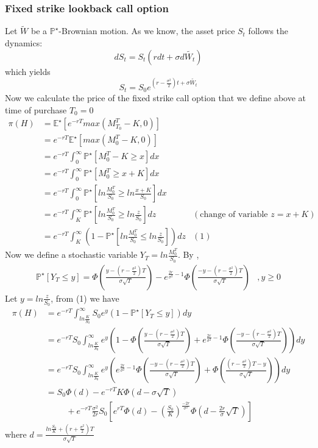 \documentclass{article}
\begin{document}
\subsubsection{Fixed strike lookback call option
}
Let $\widetilde{W}$ be a $\mathbb{P}^{\star}$-Brownian motion. As we know, the asset price $S_t$ follows the dynamics:
\[
dS_t=S_t(rdt + \sigma d \widetilde{W_t})
\]
which yields
\[
S_t=S_0 e^{(r - \frac{\sigma^2}{2})t + \sigma \widetilde{W_t}}
\]
Now we calculate the price of the fixed strike call option that we define above at time of purchase $T_0=0$
\begin{align*}
\pi(H) 	&= \mathbb{E^{\star}}[e^{-rT} max(M_{T_0}^T - K, 0)] \\
			&= e^{-rT} \mathbb{E^{\star}}[max(M_{0}^T - K, 0)] \\
			&= e^{-rT} \int_{0}^{\infty} \mathbb{P}^{\star}[M_{0}^T - K \geq x]dx \\
			&= e^{-rT} \int_{0}^{\infty} \mathbb{P}^{\star}[M_{0}^T \geq x+K]dx \\
			&= e^{-rT} \int_{0}^{\infty} \mathbb{P}^{\star}[ln \frac{M_{0}^T}{S_0} \geq ln \frac{x+K}{S_0}]dx \\
			&= e^{-rT} \int_{K}^{\infty} \mathbb{P}^{\star}[ln \frac{M_{0}^T}{S_0} \geq ln \frac{z}{S_0}]dz &(\text{change of variable } z=x+K) \\
			&= e^{-rT} \int_{K}^{\infty} ( 1 - \mathbb{P}^{\star}[ln \frac{M_{0}^T}{S_0} \leq ln \frac{z}{S_0}])dz &(1)
\end{align*}
Now we define a stochastic variable $Y_T= ln \frac{M_{0}^{T}}{S_0}$. By \cite{Peter1},
\begin{align*}
\mathbb{P}^{\star}[Y_T \leq y]= \Phi \left(\frac{y-(r-\frac{\sigma^2}{2})T}{\sigma\sqrt{T}} \right) - e^{\frac{2r}{\sigma^2} - 1} \Phi \left(\frac{-y-(r-\frac{\sigma^2}{2})T}{\sigma\sqrt{T}} \right)
&, y \geq 0
\end{align*}
Let $y=ln\frac{z}{S_0}$, from (1) we have
\begin{align*}
\pi(H) 	&= e^{-rT} \int_{ln\frac{K}{S_0}}^{\infty} S_0e^y( 1 - \mathbb{P}^{\star}[Y_T \leq y])dy \\
			&= e^{-rT}S_0 \int_{ln\frac{K}{S_0}}^{\infty} e^y \left( 1 -  
			\Phi \left(\frac{y-(r-\frac{\sigma^2}{2})T}{\sigma\sqrt{T}} \right) + e^{\frac{2r}{\sigma^2} - 1} \Phi \left(\frac{-y-(r-\frac{\sigma^2}{2})T}{\sigma\sqrt{T}} \right)
			\right) dy \\
			&= e^{-rT}S_0 \int_{ln\frac{K}{S_0}}^{\infty} e^y \left( 
			e^{\frac{2r}{\sigma^2} - 1} \Phi \left(\frac{-y-(r-\frac{\sigma^2}{2})T}{\sigma\sqrt{T}} \right)
			+ \Phi \left(\frac{(r-\frac{\sigma^2}{2})T - y}{\sigma\sqrt{T}} \right)
			\right) dy \\
			&= S_0 \Phi(d) - e^{-rT}K \Phi(d - \sigma \sqrt{T} ) \\
			&\hspace{1cm} + e^{-rT}\frac{\sigma^2}{2r}S_0 \left[
			e^{rT}\Phi(d) - \left(\frac{S_0}{K}\right)^{\frac{-2r}{\sigma^2}} \Phi\left(d- \frac{2r}{\sigma}\sqrt{T}\right)
			\right]
\end{align*}
where $d = \frac{ln\frac{S_0}{K} + (r+\frac{\sigma^2}{2})T}{\sigma\sqrt{T}}$
\end{document}

